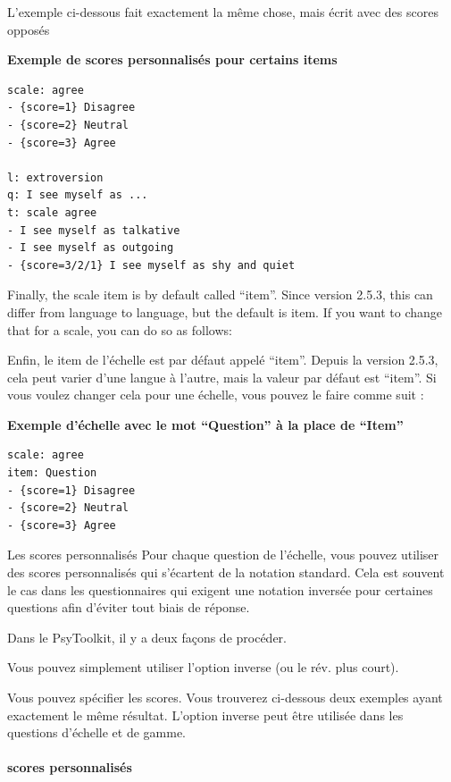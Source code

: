 \documentclass[
]{book}
\begin{document}
L'exemple ci-dessous fait exactement la même chose, mais écrit avec des scores opposés

\textbf{Exemple de scores personnalisés pour certains items}

\begin{verbatim}
scale: agree
- {score=1} Disagree
- {score=2} Neutral
- {score=3} Agree

l: extroversion
q: I see myself as ...
t: scale agree
- I see myself as talkative
- I see myself as outgoing
- {score=3/2/1} I see myself as shy and quiet
\end{verbatim}

Finally, the scale item is by default called ``item''. Since version 2.5.3, this can differ from language to language, but the default is item. If you want to change that for a scale, you can do so as follows:

Enfin, le item de l'échelle est par défaut appelé ``item''. Depuis la version 2.5.3, cela peut varier d'une langue à l'autre, mais la valeur par défaut est ``item''. Si vous voulez changer cela pour une échelle, vous pouvez le faire comme suit :

\textbf{Exemple d'échelle avec le mot ``Question'' à la place de ``Item''}

\begin{verbatim}
scale: agree
item: Question
- {score=1} Disagree
- {score=2} Neutral
- {score=3} Agree
\end{verbatim}

Les scores personnalisés
Pour chaque question de l'échelle, vous pouvez utiliser des scores personnalisés qui s'écartent de la notation standard. Cela est souvent le cas dans les questionnaires qui exigent une notation inversée pour certaines questions afin d'éviter tout biais de réponse.

Dans le PsyToolkit, il y a deux façons de procéder.

Vous pouvez simplement utiliser l'option inverse (ou le rév. plus court).

Vous pouvez spécifier les scores. Vous trouverez ci-dessous deux exemples ayant exactement le même résultat. L'option inverse peut être utilisée dans les questions d'échelle et de gamme.

\hypertarget{scores-personnalisuxe9s}{%
\paragraph{scores personnalisés}\label{scores-personnalisuxe9s}}
\end{document}

